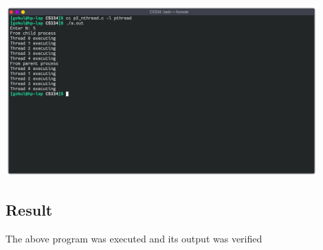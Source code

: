 \begin{center}
	\includegraphics[width=0.90\textwidth]{img/p3.png}
\end{center}

\subsection{Result}
The above program was executed and its output was verified